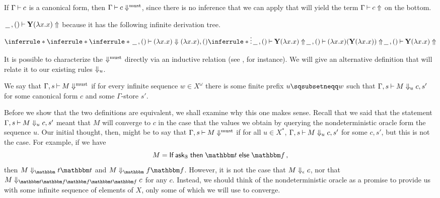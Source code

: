 \documentclass[11pt]{report}
\begin{document}
\begin{example}
  If $\Gamma\mathbin{\vdash} c$ is a canonical form, then $\Gamma\mathbin{\vdash} c\Downarrow^{\text{must}}$, since there is no inference that we can apply that will yield the term $\Gamma\mathbin{\vdash} c\Uparrow$ on the bottom.
\end{example}

\begin{example}
  $\,\underline{\hspace{1.5ex}}\,,()\mathbin{\vdash} \mathbf{Y}(\lambda x.x)\Uparrow$ because it has the following infinite derivation tree.
  \[
    \inferrule*
    {
      \inferrule*
      {
        \inferrule*
        {
        }
        {
          \blank,()\ts (\lambda x.x) \converges (\lambda x.x),()
        }
        \\
        \inferrule*
        {
          \vdots
        }
        {
          \blank,() \ts \Y(\lambda x.x)\diverges
        }
      }
      {
        \blank,()\ts (\lambda x.x)(\Y(\lambda x.x)) \diverges
      }
    }
    {
      \blank,()\ts \Y(\lambda x.x)\diverges
    }
    \]
\end{example}

It is possible to characterize the $\Downarrow^{\text{must}}$ directly via an inductive relation (see \cite{RusssThesis}, for instance).  
We will give an alternative definition that will relate it to our existing rules $\Downarrow_u$.

\begin{definition}
  We say that $\Gamma,s\mathbin{\vdash} M\Downarrow^{\text{must}}$ if for every infinite sequence $w\in X^\omega$ there is some finite prefix $u\pprefix w$ such that $\Gamma,s\mathbin{\vdash} M\Downarrow_u c,s'$ for some canonical form $c$ and some $\Gamma$-store $s'$.
  \label{DefMustConvergence}
\end{definition}

Before we show that the two definitions are equivalent, we shall examine why this one makes sense.  
Recall that we said that the statement $\Gamma,s\mathbin{\vdash} M\Downarrow_u c,s'$ meant that $M$ will converge to $c$ in the case that the values we obtain by querying the nondeterministic oracle form the sequence $u$.  
Our initial thought, then, might be to say that $\Gamma,s\mathbin{\vdash} M\Downarrow^{\text{must}}$ if for all $u\in X^*$, $\Gamma,s\mathbin{\vdash} M\Downarrow_u c,s'$ for some $c,s'$, but this is not the case.  
For example, if we have
\[
  M = \If \ask_\bB \Then \true \Else \false\,,
  \]
then $M\converges_\true \true$ and $M\converges_\false \false$.  
However, it is not the case that $M\Downarrow_\epsilon c$, nor that $M\converges_{\true\false\false\true\false}c$ for any $c$.
Instead, we should think of the nondeterministic oracle as a promise to provide us with some infinite sequence of elements of $X$, only some of which we will use to converge.
\end{document}
